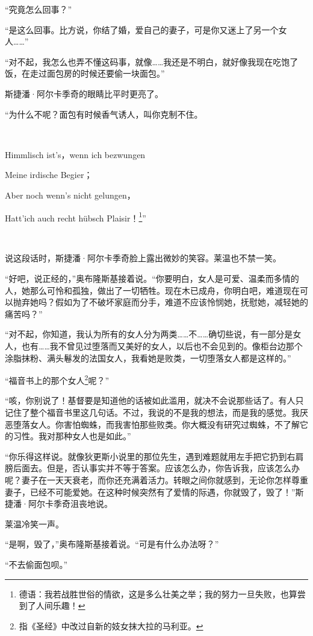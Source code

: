 \par “究竟怎么回事？”
\par “是这么回事。比方说，你结了婚，爱自己的妻子，可是你又迷上了另一个女人……”
\par “对不起，我怎么也弄不懂这码事，就像……我还是不明白，就好像我现在吃饱了饭，在走过面包房的时候还要偷一块面包。”
\par 斯捷潘·阿尔卡季奇的眼睛比平时更亮了。
\par “为什么不呢？面包有时候香气诱人，叫你克制不住。
\par  
\par Himmlisch ist's，wenn ich bezwungen
\par Meine irdische Begier；
\par Aber noch wenn's nicht gelungen，
\par Hatt'ich auch recht hübsch Plaisir！\footnote{德语：我若战胜世俗的情欲，这是多么壮美之举；我的努力一旦失败，也算尝到了人间乐趣！}”
\par  
\par 说这段话时，斯捷潘·阿尔卡季奇脸上露出微妙的笑容。莱温也不禁一笑。
\par “好吧，说正经的，”奥布隆斯基接着说。“你要明白，女人是可爱、温柔而多情的人，她那么可怜和孤独，做出了一切牺牲。现在木已成舟，你明白吧，难道现在可以抛弃她吗？假如为了不破坏家庭而分手，难道不应该怜悯她，抚慰她，减轻她的痛苦吗？”
\par “对不起，你知道，我认为所有的女人分为两类……不……确切些说，有一部分是女人，也有……我不曾见过堕落而又美好的女人，以后也不会见到的。像柜台边那个涂脂抹粉、满头鬈发的法国女人，我看她是败类，一切堕落女人都是这样的。”
\par “福音书上的那个女人\footnote{指《圣经》中改过自新的妓女抹大拉的马利亚。}呢？”
\par “咳，你别说了！基督要是知道他的话被如此滥用，就决不会说那些话了。有人只记住了整个福音书里这几句话。不过，我说的不是我的想法，而是我的感觉。我厌恶堕落女人。你害怕蜘蛛，而我害怕那些败类。你大概没有研究过蜘蛛，不了解它的习性。我对那种女人也是如此。”
\par “你乐得这样说。就像狄更斯小说里的那位先生，遇到难题就用左手把它扔到右肩膀后面去。但是，否认事实并不等于答案。应该怎么办，你告诉我，应该怎么办呢？妻子在一天天衰老，而你还充满着活力。转眼之间你就感到，无论你怎样尊重妻子，已经不可能爱她。在这种时候突然有了爱情的际遇，你就毁了，毁了！”斯捷潘·阿尔卡季奇沮丧地说。
\par 莱温冷笑一声。
\par “是啊，毁了，”奥布隆斯基接着说。“可是有什么办法呀？”
\par “不去偷面包呗。”
